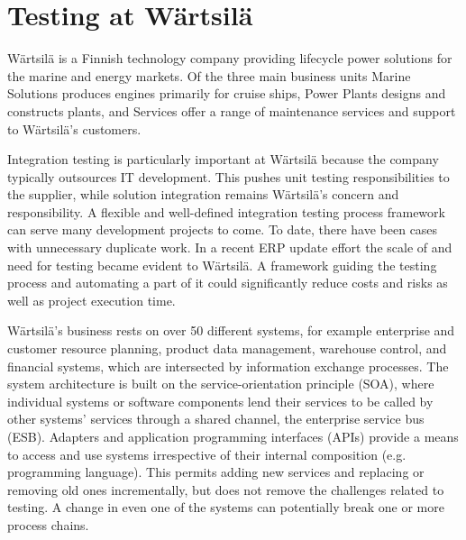 \documentclass[12pt,a4paper,oneside,pdftex]{report}
\begin{document}
\section{Testing at Wärtsilä}

Wärtsilä is a Finnish technology company providing lifecycle power solutions for the marine and energy markets. Of the three main business units Marine Solutions produces engines primarily for cruise ships, Power Plants designs and constructs plants, and Services offer a range of maintenance services and support to Wärtsilä's customers. \citep{wartsila2013web}


Integration testing is particularly important at Wärtsilä because the company typically outsources IT development. This pushes unit testing responsibilities to the supplier, while solution integration remains Wärtsilä's concern and responsibility. A flexible and well-defined integration testing process framework can serve many development projects to come. To date, there have been cases with unnecessary duplicate work. In a recent ERP update effort the scale of and need for testing became evident to Wärtsilä. A framework guiding the testing process and automating a part of it could significantly reduce costs and risks as well as project execution time.

Wärtsilä's business rests on over 50 different systems, for example enterprise and customer resource planning, product data management, warehouse control, and financial systems, which are intersected by information exchange processes. The system architecture is built on the service-orientation principle (SOA), where individual systems or software components lend their services to be called by other systems' services through a shared channel, the enterprise service bus (ESB). Adapters and application programming interfaces (APIs) provide a means to access and use systems irrespective of their internal composition (e.g. programming language). This permits adding new services and replacing or removing old ones incrementally, but does not remove the challenges related to testing. A change in even one of the systems can potentially break one or more process chains. 
\end{document}
